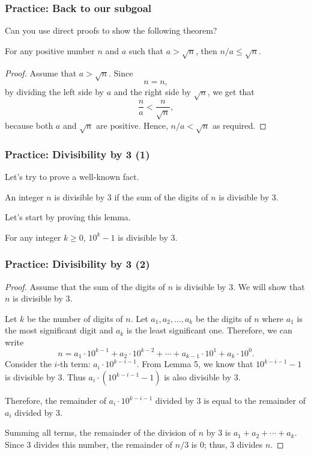 \begin{frame}\frametitle{Practice: Back to our subgoal}
  Can you use direct proofs to show the following theorem?

  \begin{theorem}
    For any positive number $n$ and $a$ such that $a > \sqrt{n}$, then
    $n/a\leq\sqrt{n}$.
  \end{theorem} \pause

  \begin{proof}
    Assume that $a > \sqrt{n}$. \pause
    Since
    \[ n = n, \]
    by dividing the left side by $a$ and the right side by $\sqrt{n}$,
    we get that
    \[ \frac{n}{a} < \frac{n}{\sqrt{n}}, \]
    because both $a$ and $\sqrt{n}$ are positive.  Hence, $n/a <
    \sqrt{n}$ as required.
  \end{proof}
\end{frame}

\begin{frame}\frametitle{Practice: Divisibility by 3 (1)}
  Let's try to prove a well-known fact.

  \begin{theorem}
    An integer $n$ is divisible by $3$ if the sum of the digits of $n$
    is divisible by $3$.
  \end{theorem}
  \pause

  \vspace{0.2in}
  Let's start by proving this lemma.

  \begin{lemma}
    For any integer $k\geq 0$, $10^k - 1$ is divisible by $3$.
  \end{lemma}
\end{frame}

\begin{frame}\frametitle{Practice: Divisibility by 3 (2)}
  {\small
    \begin{proof}
      Assume that the sum of the digits of $n$ is divisible by $3$.
      We will show that $n$ is divisible by $3$.
      
      Let $k$ be the number of digits of $n$.  Let
      $a_1,a_2,\ldots,a_k$ be the digits of $n$ where $a_1$ is the
      most significant digit and $a_k$ is the least significant one.
      Therefore, we can write
      \[ n = a_1\cdot 10^{k-1} + a_2\cdot 10^{k-2} + \cdots + a_{k-1}\cdot 10^1 + a_k\cdot 10^0.\]
      Consider the $i$-th term: $a_i\cdot 10^{k-i-1}$.  From Lemma 5,
      we know that $10^{k-i-1} - 1$ is divisible by 3.  Thus
      $a_i\cdot(10^{k-i-1}-1)$ is also divisible by $3$.

      Therefore, the remainder of $a_i\cdot 10^{k-i-1}$ divided by $3$
      is equal to the remainder of $a_i$ divided by $3$.

      Summing all terms, the remainder of the division of $n$ by $3$
      is $a_1+a_2+\cdots+ a_k$.  Since $3$ divides this number, the
      remainder of $n/3$ is 0; thus, $3$ divides $n$.
    \end{proof}
  }
\end{frame}

